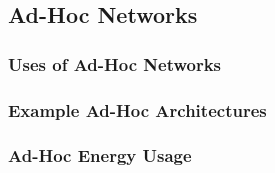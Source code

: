 \subsection{Ad-Hoc Networks}\label{subsec:Ad_Hoc_Networks}
\subsubsection{Uses of Ad-Hoc Networks}\label{subsubsec:Uses_Ad_Hoc_Network}
\subsubsection{Example Ad-Hoc Architectures}\label{subsubsec:Ad_Hoc_Architectures}
\subsubsection{Ad-Hoc Energy Usage}\label{subsubsec:Ad_Hoc_Architectures}

